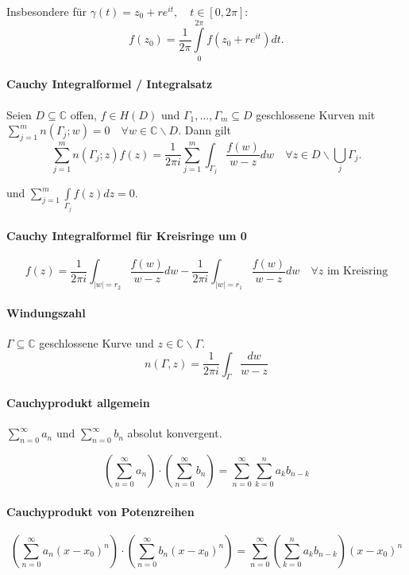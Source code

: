\documentclass[a4paper, 10pt, DIV20, headings=small]{scrartcl}
\theoremstyle{definition}
\theoremstyle{plain}
\begin{document}
Insbesondere für $\gamma(t) = z_0 + r e^{it},\quad t \in [0,2\pi]$:
$$f(z_0) = \frac{1}{2 \pi} \int\limits_{0}^{2 \pi}f(z_0 + r e^{it}) dt.$$

\paragraph{Cauchy Integralformel / Integralsatz}
Seien $D \subseteq \mathbb{C}$ offen, $f \in H(D)$ und $\Gamma_1, \ldots, \Gamma_m \subseteq D$ geschlossene Kurven mit $\sum\limits_{j=1}^m{n(\Gamma_j;w)} = 0\quad \forall w \in \mathbb{C} \backslash D$. Dann gilt
$$\sum\limits_{j=1}^m {n(\Gamma_j;z)}f(z) = \frac{1}{2 \pi i} \sum\limits_{j=1}^m{ \int_{\Gamma_j} \frac{f(w)}{w-z} dw} \quad \forall z \in D \backslash \bigcup_j {\Gamma_j}.$$

und $\sum\limits_{j=1}^m{\int\limits_{\Gamma_j}{f(z) dz}} = 0$.

\paragraph{Cauchy Integralformel für Kreisringe um 0}
$$f(z) = \frac{1}{2 \pi i} \int_{|w|=r_2} \frac{f(w)}{w-z} dw - \frac{1}{2 \pi i} \int_{|w|=r_1} \frac{f(w)}{w-z} dw \quad \forall z \text{ im Kreisring}$$

\paragraph{Windungszahl}
$\Gamma \subseteq \mathbb{C}$ geschlossene Kurve und $z \in \mathbb{C} \backslash \Gamma$.
$$n(\Gamma, z) = \frac{1}{2 \pi i} \int_\Gamma \frac{dw}{w-z}$$


\paragraph{Cauchyprodukt allgemein}
$\sum\limits_{n=0}^{\infty}a_n \text{ und } \sum\limits_{n=0}^{\infty}b_n$ absolut konvergent.

$$\left (\sum\limits_{n=0}^{\infty}a_n \right ) \cdot \left (\sum\limits_{n=0}^{\infty}b_n\right ) = \sum\limits_{n=0}^{\infty}{\sum\limits_{k=0}^n{a_k b_{n-k}}}$$

\paragraph{Cauchyprodukt von Potenzreihen}
$$\left( \sum\limits_{n=0}^{\infty}{a_n (x-x_0)^n} \right) \cdot 
\left( \sum\limits_{n=0}^{\infty}{b_n (x-x_0)^n} \right) =
\sum\limits_{n=0}^{\infty} \left( \sum\limits_{k=0}^n{a_k b_{n-k}} \right) (x-x_0)^n$$
\end{document}
